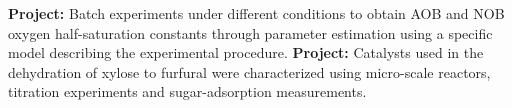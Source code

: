 \documentclass[11pt,a4paper,sans]{moderncv}
\begin{document}
{\begin{minipage}{\textwidth}
		
		{\textbf{Project:} \small Batch experiments under different conditions to obtain AOB and NOB oxygen half-saturation constants through parameter estimation using a specific model describing the experimental procedure.}
		{\textbf{Project:} \small Catalysts used in the dehydration of xylose to furfural were characterized using micro-scale reactors, titration experiments and sugar-adsorption measurements.}
		\vspace{0.5cm}
	\end{minipage}
}
\end{document}
